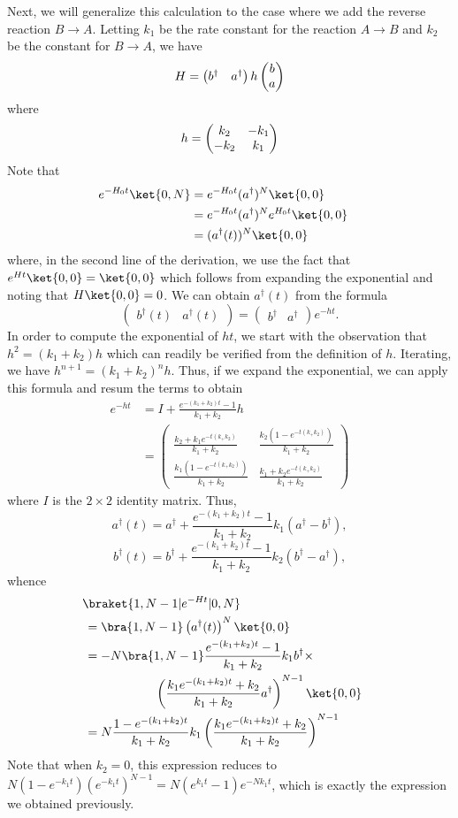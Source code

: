 Next, we will generalize this calculation to the case where we add the reverse reaction $B \to A$.  Letting $k_1$ be the rate constant for the reaction $A \to B$ and $k_2$ be the constant for $B \to A$, we have
\[
 H = \begin{pmatrix} b^\dagger & a^\dagger \end{pmatrix} h \begin{pmatrix} b \cr a \end{pmatrix}
\]
where
\[
 h = \begin{pmatrix} k_2 & -k_1 \cr -k_2 & k_1 \end{pmatrix}
\]
Note that
\begin{align*}
 e^{-H_0 t} \ket{0, N} &=
 e^{-H_0 t} (a^\dagger)^N \ket{0, 0} \cr &=
 e^{-H_0 t} (a^\dagger)^N e^{H_0 t} \ket{0, 0} \cr &=
 (a^\dagger (t))^N \ket{0, 0}
\end{align*}
where, in the second line of the derivation, we use the fact that $e^{Ht} \ket{0, 0} = \ket{0, 0}$ which follows from expanding the exponential and noting that $H \ket{0, 0} = 0$.  We can obtain $a^\dagger (t)$ from the formula
\[
 \begin{pmatrix} b^\dagger(t) & a^\dagger(t) \end{pmatrix} =
 \begin{pmatrix} b^\dagger & a^\dagger \end{pmatrix} e^{-ht} .
\]
In order to compute the exponential of $ht$, we start with the observation that $h^2 = (k_1 + k_2) h$ which can readily be verified from the definition of $h$.  Iterating, we have $h^{n+1} = (k_1 + k_2)^n h$.  Thus, if we expand the exponential, we can apply this formula and resum the terms to obtain
\begin{align*}
 e^{-ht} &= I + \frac{e^{-(k_1 + k_2) t} - 1}{k_1 + k_2} h \\ &=
 \begin{pmatrix} \frac{k_2 + k_1 e^{-t(k_ + k_2)}}{k_1 + k_2} &
   \frac{k_2 (1 - e^{-t(k_ + k_2)})}{k_1 + k_2} \\
 \frac{k_1 (1 - e^{-t(k_ + k_2)})}{k_1 + k_2} &
    \frac{k_1 + k_2 e^{-t(k_ + k_2)}}{k_1 + k_2}
 \end{pmatrix}
\end{align*}
where $I$ is the $2 \times 2$ identity matrix.  Thus,
\[
 a^\dagger (t) = a^\dagger +
 \frac{e^{-(k_1 + k_2) t} - 1}{k_1 + k_2} k_1 (a^\dagger - b^\dagger) ,
\]
\[
 b^\dagger (t) = b^\dagger +
 \frac{e^{-(k_1 + k_2) t} - 1}{k_1 + k_2} k_2 (b^\dagger - a^\dagger) ,
\]
whence
\begin{align*}
 &\!\braket{1, N-1 | e^{-Ht} | 0, N} \cr &=
 \bra{1, N-1} \left( a^\dagger (t) \right)^N \ket{0, 0} \cr &=
 -N \bra{1, N-1} \frac{e^{-(k_1 + k_2) t} - 1}{k_1 + k_2} k_1 b^\dagger \times \cr
   &\hskip2cm \left( \frac{k_1 e^{-(k_1 + k_2) t} + k_2}{k_1 + k_2} a^\dagger \right)^{N-1} \ket{0, 0} \cr &=
 N \frac{1 - e^{-(k_1 + k_2) t}}{k_1 + k_2} k_1 \left( \frac{k_1 e^{-(k_1 + k_2) t} + k_2}{k_1 + k_2} \right)^{N-1}
\end{align*}
Note that when $k_2 = 0$, this expression reduces to $N(1-e^{-k_1 t})(e^{-k_1 t})^{N-1} =N (e^{k_1 t} - 1) e^{-N k_1 t}$, which is exactly the expression we obtained previously.

